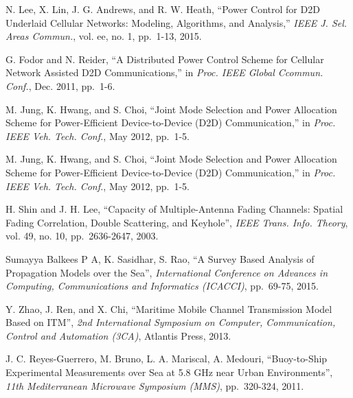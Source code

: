 \documentclass{ieeeaccess}
\begin{document}
\begin{thebibliography}{10}
  N. Lee, X. Lin, J. G. Andrews, and R. W. Heath, ``Power Control for D2D Underlaid Cellular Networks: Modeling, Algorithms, and Analysis,''
  \emph{IEEE J. Sel. Areas Commun.}, vol. ee, no. 1, pp.~1-13, 2015.

  G. Fodor and N. Reider, ``A Distributed Power Control Scheme for Cellular Network Assisted D2D Communications,'' in
  \emph{Proc. IEEE Global Ccommun. Conf.}, Dec. 2011, pp.~1-6.

  M. Jung, K. Hwang, and S. Choi, ``Joint Mode Selection and Power Allocation Scheme for Power-Efficient Device-to-Device (D2D) Communication,'' in
  \emph{Proc. IEEE Veh. Tech. Conf.}, May 2012, pp.~1-5.
  
  M. Jung, K. Hwang, and S. Choi, ``Joint Mode Selection and Power Allocation Scheme for Power-Efficient Device-to-Device (D2D) Communication,'' in
  \emph{Proc. IEEE Veh. Tech. Conf.}, May 2012, pp.~1-5.

  H. Shin and J. H. Lee, ``Capacity of Multiple-Antenna Fading Channels: Spatial Fading Correlation, Double Scattering, and Keyhole'',
  \emph{IEEE Trans. Info. Theory}, vol. 49, no. 10, pp.~2636-2647, 2003.

  Sumayya Balkees P A, K. Sasidhar, S. Rao, ``A Survey Based Analysis of Propagation Models over the Sea'',
  \emph{International Conference on Advances in Computing, Communications and Informatics (ICACCI)}, pp.~69-75, 2015.
  
  Y. Zhao, J. Ren, and X. Chi, ``Maritime Mobile Channel Transmission Model Based on ITM'',
  \emph{2nd International Symposium on Computer, Communication, Control and Automation (3CA)}, Atlantis Press, 2013.
  
  J. C. Reyes-Guerrero, M. Bruno, L. A. Mariscal, A. Medouri, ``Buoy-to-Ship Experimental Measurements over Sea at 5.8 GHz near Urban Environments'',
  \emph{11th Mediterranean Microwave Symposium (MMS)}, pp.~320-324, 2011.




\end{thebibliography}
\end{document}
